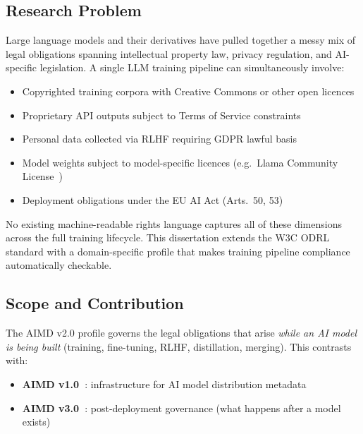 \documentclass[12pt,a4paper]{article}
\begin{document}
\subsection{Research Problem}

Large language models and their derivatives have pulled together a messy mix of legal obligations spanning intellectual property law, privacy regulation, and AI-specific legislation. A single LLM training pipeline can simultaneously involve:

\begin{itemize}[noitemsep]
  \item Copyrighted training corpora with Creative Commons or other open licences
  \item Proprietary API outputs subject to Terms of Service constraints
  \item Personal data collected via RLHF requiring GDPR lawful basis
  \item Model weights subject to model-specific licences (e.g.\ Llama Community License~\cite{llamalicence})
  \item Deployment obligations under the EU AI Act (Arts.\ 50, 53)
\end{itemize}

No existing machine-readable rights language captures all of these dimensions across the full training lifecycle. This dissertation extends the W3C ODRL standard with a domain-specific profile that makes training pipeline compliance automatically checkable.

\subsection{Scope and Contribution}

The AIMD v2.0 profile governs the legal obligations that arise \emph{while an AI model is being built} (training, fine-tuning, RLHF, distillation, merging). This contrasts with:

\begin{itemize}[noitemsep]
  \item \textbf{AIMD v1.0~\cite{twomey2024}}: infrastructure for AI model distribution metadata
  \item \textbf{AIMD v3.0~\cite{mathew2026}}: post-deployment governance (what happens after a model exists)
\end{itemize}
\end{document}
